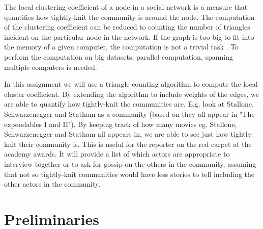 \documentclass{article}
\begin{document}

The local clustering coefficient of a node in a social network is a measure that quantifies how tightly-knit the community is around the node. The computation of the clustering coefficient can be reduced to counting the number of triangles incident on the particular node in the network. If the graph is too big to fit into the memory of a given computer, the computation is not a trivial task \cite{countingTriangles}. To perform the computation on big datasets, parallel computation, spanning multiple computers is needed. 

In this assignment we will use a triangle counting algorithm \cite{triangleCounting} to compute the local cluster coefficient. By extending the algorithm to include weights of the edges, we are able to quantify how tightly-knit the communities are. E.g. look at Stallone, Schwarzenegger and Statham as a community (based on they all appear in "The expendables I and II"). By keeping track of how many movies eg. Stallone, Schwarzenegger and Statham all appears in, we are able to see just how tightly-knit their community is. This is useful for the reporter on the red carpet at the academy awards. It will provide a list of which actors are appropriate to interview together or to ask for gossip on the others in the community, assuming that not so tightly-knit communities would have less stories to tell including the other actors in the community.

\section{Preliminaries}
\end{document}
